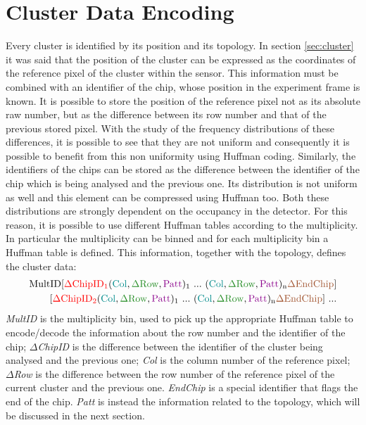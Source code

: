 \section{Cluster Data Encoding}
Every cluster is identified by its position and its topology. In section \ref{sec:cluster} it was said that the position of the cluster can be expressed as the coordinates of the reference pixel of the cluster within the sensor. This information must be combined with an identifier of the chip, whose position in the experiment frame is known. It is possible to store the position of the reference pixel not as its absolute raw number, but as the difference between its row number and that of the previous stored pixel. With the study of the frequency distributions of these differences, it is possible to see that they are not uniform and consequently it is possible to benefit from this non uniformity using Huffman coding. Similarly, the identifiers of the chips can be stored as the difference between the identifier of the chip which is being analysed and the previous one. Its distribution is not uniform as well and this element can be compressed using Huffman too. Both these distributions are strongly dependent on the occupancy in the detector. For this reason, it is possible to use different Huffman tables according to the multiplicity. In particular the multiplicity can be binned and for each multiplicity bin a Huffman table is defined. This information, together with the topology, defines the cluster data:
\begin{displaymath}
\begin{split}
  \mathrm{MultID[\textcolor{red}{\Delta ChipID_1}(\textcolor{Cerulean}{Col}, \textcolor{LimeGreen}{\Delta Row}, \textcolor{Plum}{Patt})_1 \  ... \ (\textcolor{Cerulean}{Col}, \textcolor{LimeGreen}{\Delta Row}, \textcolor{Plum}{Patt})_n \textcolor{SkyBlue}{\Delta EndChip}] }\\
 \mathrm{[\textcolor{red}{\Delta ChipID_2}(\textcolor{Cerulean}{Col}, \textcolor{LimeGreen}{\Delta Row}, \textcolor{Plum}{Patt})_1 \  ... \ (\textcolor{Cerulean}{Col}, \textcolor{LimeGreen}{\Delta Row}, \textcolor{Plum}{Patt})_n \textcolor{SkyBlue}{\Delta EndChip}]\ ...}
 \end{split}
\end{displaymath}
\textit{MultID} is the multiplicity bin, used to pick up the appropriate Huffman table to encode/decode the information about the row number and the identifier of the chip; \textit{$\Delta$ChipID} is the difference between the identifier of the cluster being analysed and the previous one; \textit{Col} is the column number of the reference pixel; \textit{$\Delta$Row} is the difference between the row number of the reference pixel of the current cluster and the previous one. \textit{EndChip} is a special identifier that flags the end of the chip. \textit{Patt} is instead the information related to the topology, which will be discussed in the next section.
